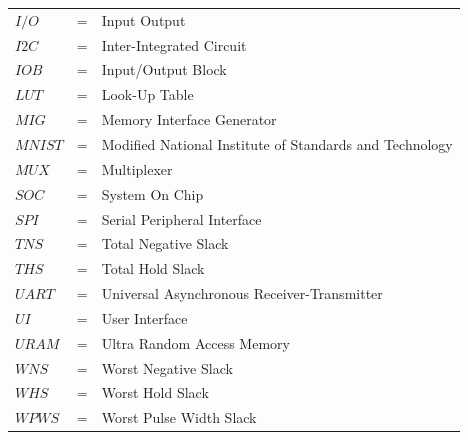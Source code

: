\begin{tabular}{llp{3in}}
    $I/O$   & \hspace{1.5cm} = & Input Output \\
    $I2C$   & \hspace{1.5cm} = & Inter-Integrated Circuit \\
    $IOB$   & \hspace{1.5cm} = & Input/Output Block \\
    $LUT$   & \hspace{1.5cm} = & Look-Up Table \\
    $MIG$   & \hspace{1.5cm} = & Memory Interface Generator \\
    $MNIST$ & \hspace{1.5cm} = & Modified National Institute of Standards and Technology \\
    $MUX$   & \hspace{1.5cm} = & Multiplexer \\
    $SOC$   & \hspace{1.5cm} = & System On Chip \\
    $SPI$   & \hspace{1.5cm} = & Serial Peripheral Interface \\
    $TNS$   & \hspace{1.5cm} = & Total Negative Slack \\
    $THS$   & \hspace{1.5cm} = & Total Hold Slack \\
    $UART$  & \hspace{1.5cm} = & Universal Asynchronous Receiver-Transmitter \\
    $UI$    & \hspace{1.5cm} = & User Interface \\
    $URAM$  & \hspace{1.5cm} = & Ultra Random Access Memory \\
    $WNS$   & \hspace{1.5cm} = & Worst Negative Slack \\
    $WHS$   & \hspace{1.5cm} = & Worst Hold Slack \\
    $WPWS$  & \hspace{1.5cm} = & Worst Pulse Width Slack \\
\end{tabular}